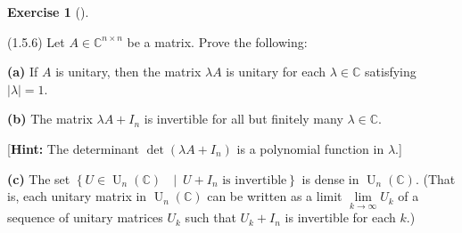 \documentclass[numbers=enddot,12pt,final,onecolumn,notitlepage]{scrartcl}
\newcounter{exer}
\theoremstyle{definition}
\newtheorem{exmp}[exer]{Exercise}
\newenvironment{exercise}[1][]
{\begin{exmp}[#1]\begin{leftbar}}
        {\end{leftbar}\end{exmp}}
\begin{document}
\begin{exercise}
	\label{exe.unitary.skew-herm.2} (1.5.6) Let $A\in\mathbb{C}^{n\times n}$ be a
	matrix. Prove the following: \medskip

	\textbf{(a)} If $A$ is unitary, then the matrix $\lambda A$ is unitary for
	each $\lambda\in\mathbb{C}$ satisfying $\left\vert \lambda\right\vert =1$.
	\medskip

	\textbf{(b)} The matrix $\lambda A+I_{n}$ is invertible for all but finitely
	many $\lambda\in\mathbb{C}$. \medskip

	[\textbf{Hint:} The determinant $\det\left(  \lambda A+I_{n}\right)  $ is a
		polynomial function in $\lambda$.] \medskip

	\textbf{(c)} The set $\left\{  U\in\operatorname*{U}\nolimits_{n}\left(
		\mathbb{C}\right)  \text{ }\mid\ U+I_{n}\text{ is invertible}\right\}  $ is
	dense in $\operatorname*{U}\nolimits_{n}\left(  \mathbb{C}\right)  $. (That
	is, each unitary matrix in $\operatorname*{U}\nolimits_{n}\left(
		\mathbb{C}\right)  $ can be written as a limit $\lim\limits_{k\rightarrow
			\infty}U_{k}$ of a sequence of unitary matrices $U_{k}$ such that $U_{k}%
		+I_{n}$ is invertible for each $k$.)
\end{exercise}
\end{document}
